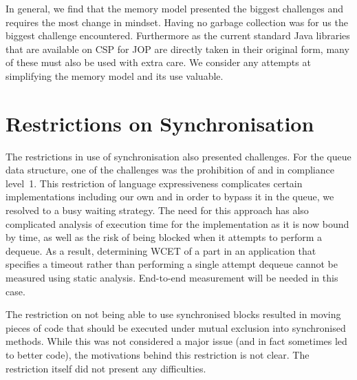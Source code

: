 In general, we find that the memory model presented the biggest challenges and requires the most change in mindset. Having no garbage collection was for us the biggest challenge encountered. Furthermore as the current standard Java libraries that are available on CSP for JOP are directly taken in their original form, many of these must also be used with extra care. We consider any attempts at simplifying the memory model and its use valuable.

 \section{Restrictions on Synchronisation} %
 \label{sec:restrictions_on_synchronisation}
The restrictions in use of synchronisation also presented challenges. For the queue data structure, one of the challenges was the prohibition of  and  in compliance level~1. This restriction of language expressiveness complicates certain implementations including our own and in order to bypass it in the queue, we resolved to a busy waiting strategy. The need for this approach has also complicated analysis of execution time for the implementation as it is now bound by time, as well as the risk of being blocked when it attempts to perform a dequeue. As a result, determining WCET of a part in an application that specifies a timeout rather than performing a single attempt dequeue cannot be measured using static analysis. End-to-end measurement will be needed in this case.

The restriction on not being able to use synchronised blocks resulted in moving pieces of code that should be executed under mutual exclusion into synchronised methods. While this was not considered a major issue (and in fact sometimes led to better code), the motivations behind this restriction is not clear. The restriction itself did not present any difficulties.